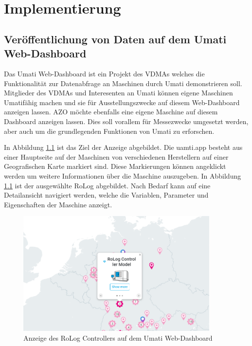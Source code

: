 \documentclass[a4paper, 12pt, oneside, toc=listofnumbered, bibliography=totoc]{scrbook}
\begin{document}
\chapter{Implementierung}\label{ch:Implementierung}
	
	\section{Veröffentlichung von Daten auf dem Umati Web-Dashboard}\label{ch:Implementierung-Web}
		
		Das Umati Web-Dashboard ist ein Projekt des VDMAs welches die Funktionalität zur Datenabfrage an Maschinen durch Umati demonstrieren soll. Mitglieder des VDMAs und Interesenten an Umati können eigene Maschinen Umatifähig machen und sie für Ausstellungszwecke auf diesem Web-Dashboard anzeigen lassen. AZO möchte ebenfalls eine eigene Maschine auf diesem Dashboard anzeigen lassen. Dies soll vorallem für Messezwecke umgesetzt werden, aber auch um die grundlegenden Funktionen von Umati zu erforschen.
		
		In Abbildung \ref{fig:umatiApp} ist das Ziel der Anzeige abgebildet. Die uamti.app besteht aus einer Hauptseite auf der Maschinen von verschiedenen Herstellern auf einer Geografischen Karte markiert sind. Diese Markierungen können angeklickt werden um weitere Informationen über die Maschine auszugeben. In Abbildung \ref{fig:umatiApp} ist der ausgewählte RoLog abgebildet. Nach Bedarf kann auf eine Detailansicht navigiert werden, welche die Variablen, Parameter und Eigenschaften der Maschine anzeigt.
		
		\begin{figure}[H]
			\centering
			\includegraphics[width=0.9\textwidth]{res/UmatiApp.png}
			\caption{Anzeige des RoLog Controllers auf dem Umati Web-Dashboard}
			\label{fig:umatiApp}
		\end{figure}
		
\end{document}
